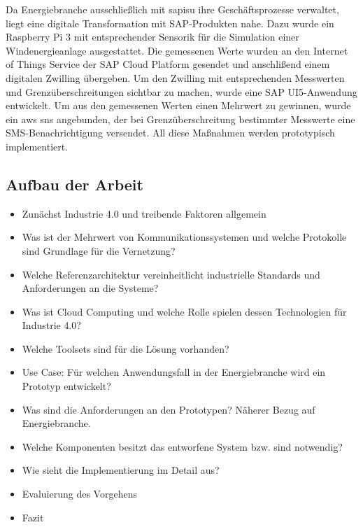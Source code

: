 Da Energiebranche ausschließlich mit \acf{sapisu} ihre Geschäftsprozesse verwaltet, liegt eine digitale Transformation
mit SAP-Produkten nahe. Dazu wurde ein Raspberry Pi 3 mit entsprechender Sensorik für die Simulation einer Windenergieanlage
ausgestattet. Die gemessenen Werte wurden an den Internet of Things Service der SAP Cloud Platform gesendet und anschlißend
einem digitalen Zwilling übergeben. Um den Zwilling mit entsprechenden Messwerten und Grenzüberschreitungen
sichtbar zu machen, wurde eine SAP UI5-Anwendung entwickelt. Um aus den gemessenen Werten einen Mehrwert zu gewinnen,
wurde ein \acf{aws} \acf{sns} angebunden, der bei Grenzüberschreitung bestimmter Messwerte eine
SMS-Benachrichtigung versendet. All diese Maßnahmen werden prototypisch implementiert.

\subsection{Aufbau der Arbeit}

\begin{itemize}
  \item Zunächst Industrie 4.0 und treibende Faktoren allgemein
  \item Was ist der Mehrwert von Kommunikationssystemen und welche Protokolle sind Grundlage für die Vernetzung?
  \item Welche Referenzarchitektur vereinheitlicht industrielle Standards und Anforderungen an die Systeme?
  \item Was ist Cloud Computing und welche Rolle spielen dessen Technologien für Industrie 4.0?
  \item Welche Toolsets sind für die Lösung vorhanden?
  \item Use Case: Für welchen Anwendungsfall in der Energiebranche wird ein Prototyp entwickelt?
  \item Was sind die Anforderungen an den Prototypen? Näherer Bezug auf Energiebranche.
  \item Welche Komponenten besitzt das entworfene System bzw. sind notwendig?
  \item Wie sieht die Implementierung im Detail aus?
  \item Evaluierung des Vorgehens
  \item Fazit
\end{itemize}



\newpage
